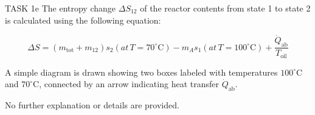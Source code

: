 TASK 1e  
The entropy change \( \Delta S_{12} \) of the reactor contents from state 1 to state 2 is calculated using the following equation:  

\[
\Delta S = (m_{\text{tot}} + m_{12}) s_2 (at \, T = 70^\circ\text{C}) - m_A s_1 (at \, T = 100^\circ\text{C}) + \frac{\dot{Q}_{\text{ab}}}{T_{\text{oil}}}
\]

A simple diagram is drawn showing two boxes labeled with temperatures \( 100^\circ\text{C} \) and \( 70^\circ\text{C} \), connected by an arrow indicating heat transfer \( \dot{Q}_{\text{ab}} \).  

No further explanation or details are provided.